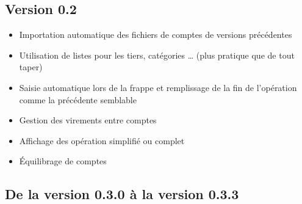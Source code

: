 \subsection{Version 0.2}

\begin{itemize}
	\item Importation automatique des fichiers de comptes de versions précédentes
	\item Utilisation de listes pour les tiers, catégories \dots{} (plus pratique que de tout taper)
	\item Saisie automatique lors de la frappe et remplissage de la fin de l'opération comme la précédente semblable
	\item Gestion des virements entre comptes
	\item Affichage des opération simplifié ou complet
	\item Équilibrage de comptes
\end{itemize}

\subsection{De la version 0.3.0 à la version 0.3.3}


